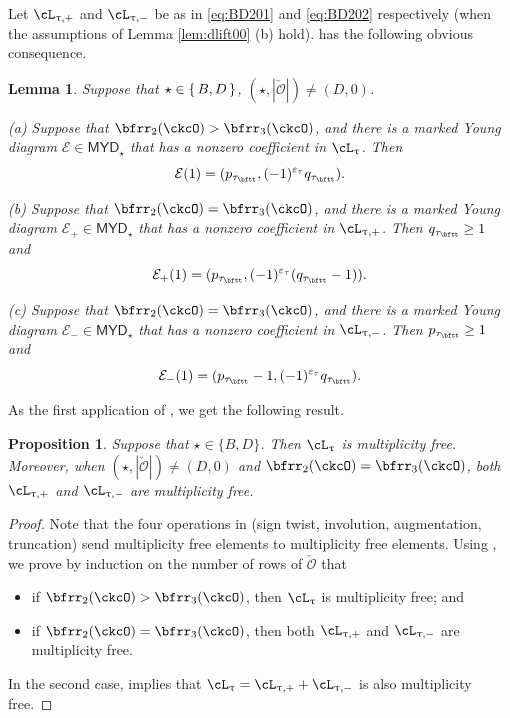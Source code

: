 \documentclass[11pt,a4paper]{amsart}
\def\MYD{{\mathsf{MYD}}}
\def\abs#1{\left|{#1}\right|}
\newcommand{\CE}{{\mathcal {E}}}
\newcommand{\CO}{{\mathcal {O}}}
\numberwithin{equation}{section}
\newtheorem{lem}[thm]{Lemma}
\newtheorem{prop}[thm]{Proposition}
\theoremstyle{remark}
\def\MYD{{\mathsf{MYD}}}
\def\ac{\cL}
\begin{document}
  Let $\ac_{\uptau,+}$ and $\ac_{\uptau,-}$ be as in \eqref{eq:BD201} and \eqref{eq:BD202} respectively (when the assumptions of 
  Lemma \ref{lem:dlift00} (b) hold).  has the following obvious consequence.
  \begin{lem}\label{taile0}
  Suppose that $\star \in \set{B,D}$, $(\star, \abs{\check \CO})\neq (D, 0)$.
  
   \noindent (a) Suppose that $\bfrr_{2}(\ckcO)>\bfrr_{3}(\ckcO)$, and there is a marked Young diagram   $\CE\in \MYD_\star$ that has a nonzero coefficient in $\ac_\uptau$. Then  
   \[
     \CE(1)=(p_{\tau_\bftt}, (-1)^{\varepsilon_\tau} q_{\tau_\bftt}).
   \]
   
   \noindent (b) Suppose that $\bfrr_{2}(\ckcO)=\bfrr_{3}(\ckcO)$, and there is a marked Young diagram   $\CE_+\in \MYD_\star$ that has a nonzero coefficient in $\ac_{\uptau,+}$. Then  $q_{\tau_\bftt}\geq 1$ and
   \[
     \CE_+(1)=( p_{\tau_\bftt}, (-1)^{\varepsilon_\tau}(q_{\tau_\bftt}-1)).
   \]
   
   \noindent (c) Suppose that $\bfrr_{2}(\ckcO)=\bfrr_{3}(\ckcO)$, and there is a marked Young diagram   $\CE_-\in \MYD_\star$ that has a nonzero coefficient in $\ac_{\uptau,-}$. Then  $p_{\tau_\bftt}\geq 1$ and
   \[
     \CE_-(1)=( p_{\tau_\bftt}-1, (-1)^{\varepsilon_\tau} q_{\tau_\bftt}).
   \]
  \end{lem}
  
 As the first application of  , we get the following result. 
 
  \begin{prop}\label{lem:dlift001}
 Suppose that $\star\in\{B,D\}$. Then $\ac_\uptau$ is multiplicity free. Moreover, when  $(\star, \abs{\check \CO})\neq(D,0)$ and $\bfrr_{2}(\ckcO)=\bfrr_{3}(\ckcO)$, both $\ac_{\uptau,+}$ and  $\ac_{\uptau,-}$ are multiplicity free.
 \end{prop}
 \begin{proof}
 Note that the four operations in  (sign twist, involution, augmentation, truncation) send multiplicity free elements to multiplicity free elements. Using , we prove by induction on the number of rows of $\check \CO$ that
 \begin{itemize}
     \item if $\bfrr_{2}(\ckcO)>\bfrr_{3}(\ckcO)$, then $\ac_\uptau$ is multiplicity free; and 
     \item
     if $\bfrr_{2}(\ckcO)=\bfrr_{3}(\ckcO)$, then both $\ac_{\uptau,+}$ and  $\ac_{\uptau,-}$ are multiplicity free. 
 \end{itemize}
 In the second case,  implies that $\ac_\uptau=\ac_{\uptau,+}+\ac_{\uptau,-}$ is also multiplicity free. 
 \end{proof}
 
\end{document}
